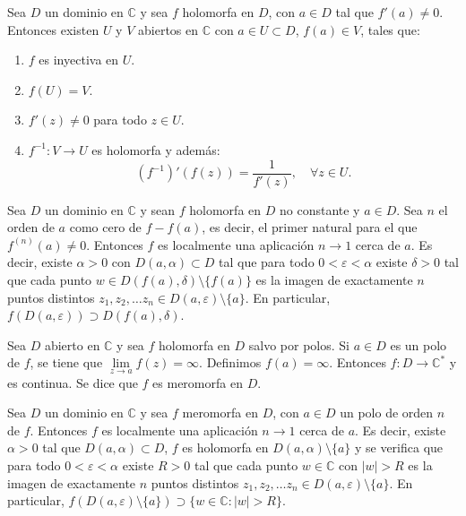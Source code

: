 \begin{theorem}
    Sea $D$ un dominio en $\mathbb{C}$ y sea $f$ holomorfa en $D$, con $a \in D$ tal que $f'(a) \neq 0$.
    Entonces existen $U$ y $V$ abiertos en $\mathbb{C}$ con $a \in U \subset D$, $f(a) \in V$, tales que:
    \begin{enumerate}
        \item $f$ es inyectiva en $U$.
        \item $f(U) = V$.
        \item $f'(z) \neq 0$ para todo $z \in U$.
        \item $f^{-1}: V \to U$ es holomorfa y además:
              $$(f^{-1})'(f(z)) = \frac{1}{f'(z)}, \quad \forall z \in U.$$
    \end{enumerate}
\end{theorem}

\begin{theorem}
    Sea $D$ un dominio en $\mathbb{C}$ y sean $f$ holomorfa en $D$ no constante y $a \in D$.
    Sea $n$ el orden de $a$ como cero de $f-f(a)$, es decir, el primer natural para el que $f^{(n)}(a) \neq 0$.
    Entonces $f$ es localmente una aplicación $n \to 1$ cerca de $a$.
    Es decir, existe $\alpha > 0$ con $D(a, \alpha) \subset D$ tal que para todo $0 < \varepsilon < \alpha$ existe $\delta > 0$ tal que cada punto $w \in D(f(a), \delta) \setminus \{f(a)\}$ es la imagen de exactamente $n$ puntos distintos $z_1, z_2, \dots z_n \in D(a, \varepsilon) \setminus \{a\}$.
    En particular, $f(D(a, \varepsilon)) \supset D(f(a), \delta)$.
\end{theorem}

\begin{definition}
    Sea $D$ abierto en $\mathbb{C}$ y sea $f$ holomorfa en $D$ salvo por polos.
    Si $a \in D$ es un polo de $f$, se tiene que $\lim\limits_{z \to a} f(z) = \infty$.
    Definimos $f(a) = \infty$.
    Entonces $f: D \to \mathbb{C}^\ast$ y es continua.
    Se dice que $f$ es meromorfa en $D$.
\end{definition}

\begin{theorem}
    Sea $D$ un dominio en $\mathbb{C}$ y sea $f$ meromorfa en $D$, con $a \in D$ un polo de orden $n$ de $f$.
    Entonces $f$ es localmente una aplicación $n \to 1$ cerca de $a$.
    Es decir, existe $\alpha > 0$ tal que $D(a, \alpha) \subset D$, $f$ es holomorfa en $D(a, \alpha) \setminus \{a\}$ y se verifica que para todo $0 < \varepsilon < \alpha$ existe $R > 0$ tal que cada punto $w \in \mathbb{C}$ con $|w| > R$ es la imagen de exactamente $n$ puntos distintos $z_1, z_2, \dots z_n \in D(a, \varepsilon) \setminus \{a\}$.
    En particular, $f(D(a, \varepsilon) \setminus \{a\}) \supset \{w \in \mathbb{C} : |w| > R\}$.
\end{theorem}


